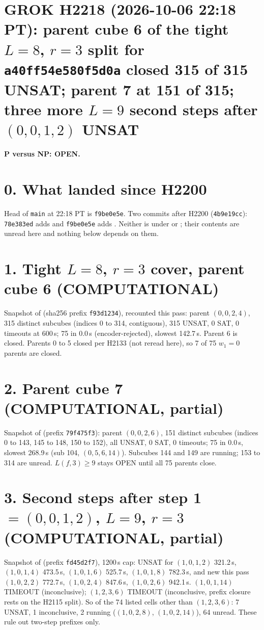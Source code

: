 \documentclass[11pt]{article}
\begin{document}
\sloppy
\section*{GROK H2218 (2026-10-06 22:18 PT): parent cube 6 of the tight $L=8$, $r=3$ split for \texttt{a40ff54e580f5d0a} closed 315 of 315 UNSAT; parent 7 at 151 of 315; three more $L=9$ second steps after $(0,0,1,2)$ UNSAT}
\textbf{P versus NP: OPEN.}

\section*{0. What landed since H2200}
Head of \texttt{main} at 22:18 PT is \texttt{f9be0e5e}. Two commits after H2200 (\texttt{4b9e19cc}): \texttt{78e383ed} adds  and \texttt{f9be0e5e} adds . Neither is under  or ; their contents are unread here and nothing below depends on them.

\section*{1. Tight $L=8$, $r=3$ cover, parent cube 6 (COMPUTATIONAL)}
Snapshot  of  (sha256 prefix \texttt{f93d1234}), recounted this pass: parent $(0,0,2,4)$, 315 distinct subcubes (indices 0 to 314, contiguous), 315 UNSAT, 0 SAT, 0 timeouts at 600\,s; 75 in 0.0\,s (encoder-rejected), slowest 142.7\,s. Parent 6 is closed. Parents 0 to 5 closed per H2133 (not reread here), so 7 of 75 $w_1=0$ parents are closed.

\section*{2. Parent cube 7 (COMPUTATIONAL, partial)}
Snapshot  of  (prefix \texttt{79f475f3}): parent $(0,0,2,6)$, 151 distinct subcubes (indices 0 to 143, 145 to 148, 150 to 152), all UNSAT, 0 SAT, 0 timeouts; 75 in 0.0\,s, slowest 268.9\,s (sub 104, $(0,5,6,14)$). Subcubes 144 and 149 are running; 153 to 314 are unread. $L(f,3)\ge 9$ stays OPEN until all 75 parents close.

\section*{3. Second steps after step 1 $=(0,0,1,2)$, $L=9$, $r=3$ (COMPUTATIONAL, partial)}
Snapshot  of  (prefix \texttt{fd45d2f7}), 1200\,s cap: UNSAT for $(1,0,1,2)$ 321.2\,s, $(1,0,1,4)$ 473.5\,s, $(1,0,1,6)$ 525.7\,s, $(1,0,1,8)$ 782.3\,s, and new this pass $(1,0,2,2)$ 772.7\,s, $(1,0,2,4)$ 847.6\,s, $(1,0,2,6)$ 942.1\,s. $(1,0,1,14)$ TIMEOUT (inconclusive); $(1,2,3,6)$ TIMEOUT (inconclusive, prefix closure rests on the H2115 split). So of the 74 listed cells other than $(1,2,3,6)$: 7 UNSAT, 1 inconclusive, 2 running ($(1,0,2,8)$, $(1,0,2,14)$), 64 unread. These rule out two-step prefixes only.
\end{document}
